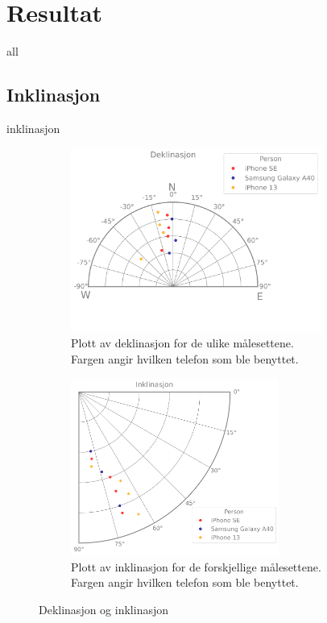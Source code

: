 \section{Resultat}

{all}

\subsection{Inklinasjon}

{inklinasjon}

\begin{figure}
    \centering
\begin{subfigure}{.5\textwidth}
    \includegraphics[width=0.9\textwidth]{Plots/declination.png}
    \caption{Plott av deklinasjon for de ulike målesettene. \\
    Fargen angir hvilken telefon som ble benyttet.}
    \label{fig:plot_declination}
\end{subfigure}%
\begin{subfigure}{.5\textwidth}
    \includegraphics[width=0.75\textwidth]{Plots/inclination.png}
    \caption{Plott av inklinasjon for de forskjellige målesettene. \\
    Fargen angir hvilken telefon som ble benyttet.}
    \label{fig:plot_inklination}
\end{subfigure}
    \caption{Deklinasjon og inklinasjon}
    \label{Ink_og_dek}
\end{figure}



